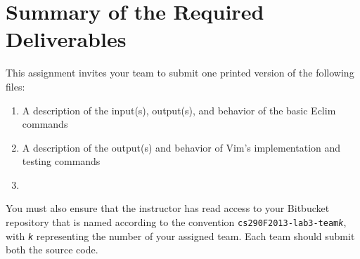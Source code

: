 \section*{Summary of the Required Deliverables}

This assignment invites your team to submit one printed version of the following files:

\begin{enumerate}
	
	\item A description of the input(s), output(s), and behavior of the basic Eclim commands 
	\item A description of the output(s) and behavior of Vim's implementation and testing commands
	\item 

\end{enumerate}

You must also ensure that the instructor has read access to your Bitbucket repository that is named according to the
convention {\tt cs290F2013-lab3-team{\em k}}, with {\tt {\em k}} representing the number of your assigned team. 
Each team should submit both the source code.


